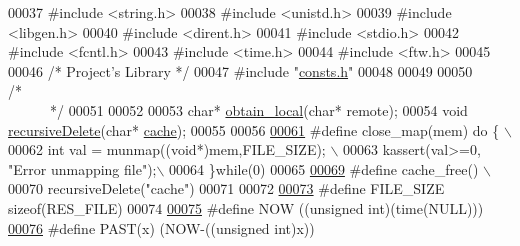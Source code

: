 \begin{DoxyCode}
00037 \textcolor{preprocessor}{#include        <string.h>}
00038 \textcolor{preprocessor}{#include        <unistd.h>}
00039 \textcolor{preprocessor}{#include        <libgen.h>}
00040 \textcolor{preprocessor}{#include        <dirent.h>}
00041 \textcolor{preprocessor}{#include        <stdio.h>}
00042 \textcolor{preprocessor}{#include        <fcntl.h>}
00043 \textcolor{preprocessor}{#include        <time.h>}
00044 \textcolor{preprocessor}{#include        <ftw.h>}
00045 
00046 \textcolor{comment}{/*      Project's Library       */}
00047 \textcolor{preprocessor}{#include        "\hyperlink{hashtable_2include_2consts_8h}{consts.h}"}
00048 
00049 
00050 \textcolor{comment}{/*~~~~~~~~~~~~~~~~~~~~~~~~~~~~~~~~~~~~~~~~~~~~~~~~~~~~~~~~~~~~~~~~~~~~~~~~~~~~*/}
00051 
00052 
00053 \textcolor{keywordtype}{char}* \hyperlink{filesystem_8c_a190fe9c539b35b922ea73c7e0a91f342}{obtain_local}(\textcolor{keywordtype}{char}* remote);
00054 \textcolor{keywordtype}{void}    \hyperlink{filesystem_8c_ad43c01993d7f6e284ee3e383c7d162ea}{recursiveDelete}(\textcolor{keywordtype}{char}* \hyperlink{init_8c_a34ae3d0938b9d34157018973a8d1534c}{cache});
00055 
00056 
\hypertarget{filesystem_8h_source_l00061}{}\hyperlink{filesystem_8h_a2d4da5463c1f828177d279738cf7558f}{00061} \textcolor{preprocessor}{#define close\_map(mem) do \{                                             \(\backslash\)}
00062 \textcolor{preprocessor}{                                int val = munmap((void*)mem,FILE\_SIZE); \(\backslash\)}
00063 \textcolor{preprocessor}{                                kassert(val>=0,  "Error unmapping file");\(\backslash\)}
00064 \textcolor{preprocessor}{                       \}while(0)}
00065 \textcolor{preprocessor}{}
\hypertarget{filesystem_8h_source_l00069}{}\hyperlink{filesystem_8h_af722ac599c55f38dd8beed1e42580507}{00069} \textcolor{preprocessor}{#define cache\_free() \(\backslash\)}
00070 \textcolor{preprocessor}{        recursiveDelete("cache")}
00071 \textcolor{preprocessor}{}
00072 
\hypertarget{filesystem_8h_source_l00073}{}\hyperlink{filesystem_8h_af3c3df6c9906ede8f09fa2af74cb28d5}{00073} \textcolor{preprocessor}{#define FILE\_SIZE                       sizeof(RES\_FILE)}
00074 \textcolor{preprocessor}{}
\hypertarget{filesystem_8h_source_l00075}{}\hyperlink{filesystem_8h_acc4a9ad83f9350a588d117e0c8916d45}{00075} \textcolor{preprocessor}{#define NOW                             ((unsigned int)(time(NULL)))}
\hypertarget{filesystem_8h_source_l00076}{}\hyperlink{filesystem_8h_ad7b0421efe66df6fb70086cba3e12240}{00076} \textcolor{preprocessor}{}\textcolor{preprocessor}{#define PAST(x)                         (NOW-((unsigned int)x))}

\end{DoxyCode}
